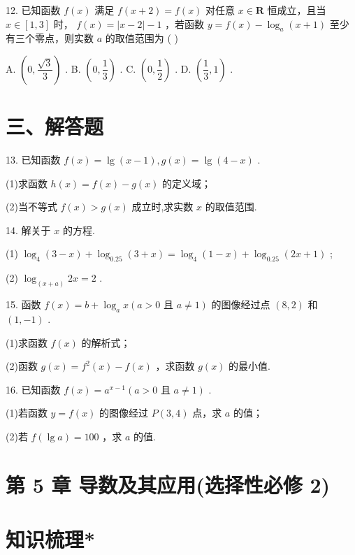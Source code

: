 12. 已知函数 $f\left( x\right)$ 满足 $f\left( {x + 2}\right)  = f\left( x\right)$ 对任意 $x \in  \mathbf{R}$ 恒成立，且当 $x \in  \left\lbrack  {1,3}\right\rbrack$ 时， $f\left( x\right)  = \left| {x - 2}\right|  - 1$ ，若函数 $y  = f\left( x\right)  - {\log }_{a}\left( {x + 1}\right)$ 至少有三个零点，则实数 $a$ 的取值范围为 ( )

A. $\left( {0,\dfrac{\sqrt{3}}{3}}\right)$ . B. $\left( {0,\dfrac{1}{3}}\right)$ . C. $\left( {0,\dfrac{1}{2}}\right)$ . D. $\left( {\dfrac{1}{3},1}\right)$ .

\section*{三、解答题}

13. 已知函数 $f\left( x\right)  = \lg \left( {x - 1}\right) ,g\left( x\right)  = \lg \left( {4 - x}\right)$ .

(1)求函数 $h\left( x\right)  = f\left( x\right)  - g\left( x\right)$ 的定义域；

(2)当不等式 $f\left( x\right)  > g\left( x\right)$ 成立时,求实数 $x$ 的取值范围.

14. 解关于 $x$ 的方程.

(1) ${\log }_{4}\left( {3 - x}\right)  + {\log }_{0.25}\left( {3 + x}\right)  = {\log }_{4}\left( {1 - x}\right)  + {\log }_{0.25}\left( {{2x} + 1}\right)$ ;

(2) ${\log }_{\left( x + a\right) }{2x} = 2$ .

15. 函数 $f\left( x\right)  = b + {\log }_{a}x\left( {a > 0\text{ 且 }a \neq  1}\right)$ 的图像经过点 $\left( {8,2}\right)$ 和 $\left( {1, - 1}\right)$ .

(1)求函数 $f\left( x\right)$ 的解析式；

(2)函数 $g\left( x\right)  = {f}^{2}\left( x\right)  - f\left( x\right)$ ，求函数 $g\left( x\right)$ 的最小值.

16. 已知函数 $f\left( x\right)  = {a}^{x - 1}\left( {a > 0\text{ 且 }a \neq  1}\right)$ .

(1)若函数 $y = f\left( x\right)$ 的图像经过 $P\left( {3,4}\right)$ 点，求 $a$ 的值；

(2)若 $f\left( {\lg a}\right)  = {100}$ ，求 $a$ 的值.

\section*{第 5 章 导数及其应用(选择性必修 2)}

\section*{知识梳理*}

